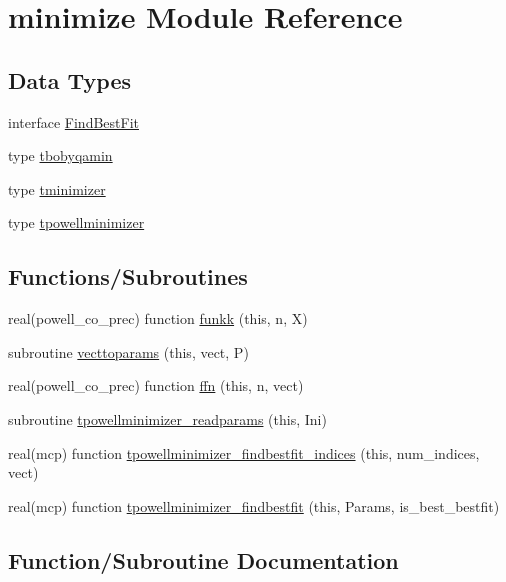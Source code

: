 \hypertarget{namespaceminimize}{}\section{minimize Module Reference}
\label{namespaceminimize}
\subsection*{Data Types}
\begin{DoxyCompactItemize}
\item 
interface \mbox{\hyperlink{interfaceminimize_1_1FindBestFit}{Find\+Best\+Fit}}
\item 
type \mbox{\hyperlink{structminimize_1_1tbobyqamin}{tbobyqamin}}
\item 
type \mbox{\hyperlink{structminimize_1_1tminimizer}{tminimizer}}
\item 
type \mbox{\hyperlink{structminimize_1_1tpowellminimizer}{tpowellminimizer}}
\end{DoxyCompactItemize}
\subsection*{Functions/\+Subroutines}
\begin{DoxyCompactItemize}
\item 
real(powell\+\_\+co\+\_\+prec) function \mbox{\hyperlink{namespaceminimize_af3ef2c6576f50826eb90dd328260fa29}{funkk}} (this, n, X)
\item 
subroutine \mbox{\hyperlink{namespaceminimize_ae5c43479fd4ab1a7fef6e43a93442e37}{vecttoparams}} (this, vect, P)
\item 
real(powell\+\_\+co\+\_\+prec) function \mbox{\hyperlink{namespaceminimize_a889da62b8c66a41e77a9d67f66d677ed}{ffn}} (this, n, vect)
\item 
subroutine \mbox{\hyperlink{namespaceminimize_a2781b5142c2289caf0a2221442578c02}{tpowellminimizer\+\_\+readparams}} (this, Ini)
\item 
real(mcp) function \mbox{\hyperlink{namespaceminimize_a0ac8b152c3df29a4c741afc485238419}{tpowellminimizer\+\_\+findbestfit\+\_\+indices}} (this, num\+\_\+indices, vect)
\item 
real(mcp) function \mbox{\hyperlink{namespaceminimize_a203054a48736df092e62d1deffc3178d}{tpowellminimizer\+\_\+findbestfit}} (this, Params, is\+\_\+best\+\_\+bestfit)
\end{DoxyCompactItemize}


\subsection{Function/\+Subroutine Documentation}
\mbox{\label{namespaceminimize_a889da62b8c66a41e77a9d67f66d677ed}} 
